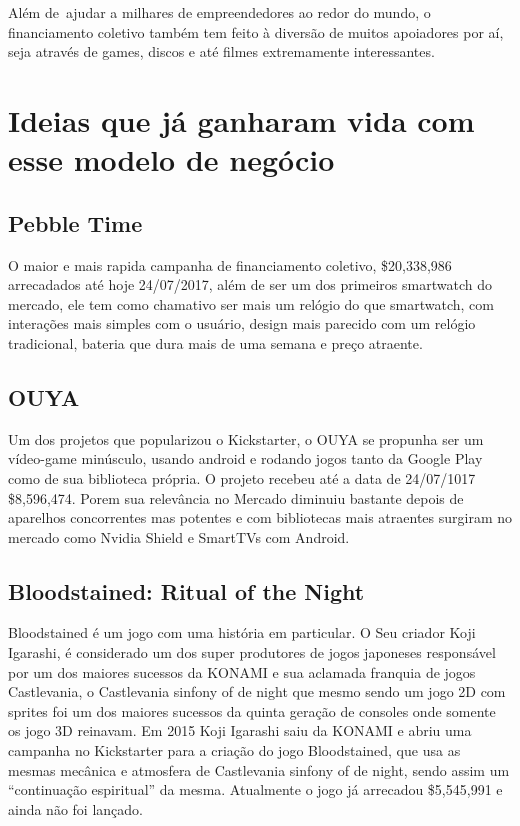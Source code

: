 \documentclass{classe_cn}                 %
\begin{document}
Além de ajudar a milhares de empreendedores ao redor do mundo, o financiamento coletivo também tem feito à diversão de muitos apoiadores por aí, seja através de games, discos e até filmes extremamente interessantes.

\section{Ideias que já ganharam vida com esse modelo de negócio}

\subsection{Pebble Time}

O maior e mais rapida campanha de financiamento coletivo, \$20,338,986 arrecadados até hoje 24/07/2017, além de ser um dos primeiros smartwatch do mercado, ele tem como chamativo ser mais um relógio do que smartwatch, com interações mais simples com o usuário, design mais parecido com um relógio tradicional, bateria que dura mais de uma semana e preço atraente. \cite{ONOFFRE:2017}

\subsection{OUYA}

Um dos projetos que popularizou o Kickstarter, o OUYA se propunha ser um vídeo-game minúsculo, usando android e rodando jogos tanto da Google Play como de sua biblioteca própria. O projeto recebeu até a data de 24/07/1017  \$8,596,474. Porem sua relevância no Mercado diminuiu bastante depois de aparelhos concorrentes mas potentes e com bibliotecas mais atraentes surgiram no mercado como Nvidia Shield e SmartTVs com Android. \cite{ONOFFRE:2017}

\subsection{Bloodstained: Ritual of the Night}

Bloodstained é um jogo com uma história em particular. O Seu criador Koji Igarashi, é considerado um dos super produtores de jogos japoneses responsável por um dos maiores sucessos da KONAMI  e sua aclamada franquia de jogos Castlevania, o Castlevania sinfony of de night que mesmo sendo um jogo 2D com sprites foi um dos maiores sucessos da quinta geração de consoles onde somente os jogo 3D reinavam. Em 2015 Koji Igarashi saiu da KONAMI e abriu uma campanha no Kickstarter para a criação do jogo Bloodstained, que usa as mesmas mecânica  e atmosfera de Castlevania sinfony of de night, sendo assim um “continuação espiritual” da mesma. Atualmente o jogo já arrecadou \$5,545,991 e ainda não foi lançado. \cite{ Velberan:2017}
\end{document}
